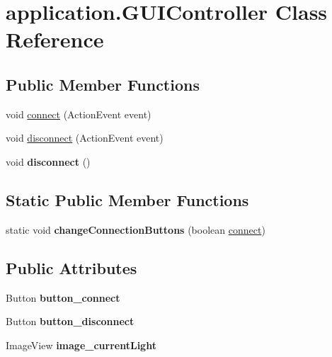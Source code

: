 \hypertarget{classapplication_1_1_g_u_i_controller}{}\section{application.\+G\+U\+I\+Controller Class Reference}
\label{classapplication_1_1_g_u_i_controller}
\subsection*{Public Member Functions}
\begin{DoxyCompactItemize}
\item 
void \hyperlink{classapplication_1_1_g_u_i_controller_ab633aa7b0d15917ec268a9a98affe53e}{connect} (Action\+Event event)
\item 
void \hyperlink{classapplication_1_1_g_u_i_controller_a560f50480318cf3c026e748e9d0e175d}{disconnect} (Action\+Event event)
\item 
void {\bfseries disconnect} ()\hypertarget{classapplication_1_1_g_u_i_controller_a1f23ccf4e55ce4a5a6ddcd86d090d3db}{}\label{classapplication_1_1_g_u_i_controller_a1f23ccf4e55ce4a5a6ddcd86d090d3db}

\end{DoxyCompactItemize}
\subsection*{Static Public Member Functions}
\begin{DoxyCompactItemize}
\item 
static void {\bfseries change\+Connection\+Buttons} (boolean \hyperlink{classapplication_1_1_g_u_i_controller_ab633aa7b0d15917ec268a9a98affe53e}{connect})\hypertarget{classapplication_1_1_g_u_i_controller_aa1c5b4085059ed56807425692e87e608}{}\label{classapplication_1_1_g_u_i_controller_aa1c5b4085059ed56807425692e87e608}

\end{DoxyCompactItemize}
\subsection*{Public Attributes}
\begin{DoxyCompactItemize}
\item 
Button {\bfseries button\+\_\+connect}\hypertarget{classapplication_1_1_g_u_i_controller_a6ade76f171c517d12818262a6acf22f9}{}\label{classapplication_1_1_g_u_i_controller_a6ade76f171c517d12818262a6acf22f9}

\item 
Button {\bfseries button\+\_\+disconnect}\hypertarget{classapplication_1_1_g_u_i_controller_adf0551f395ff11e60c5587ddd6c052ef}{}\label{classapplication_1_1_g_u_i_controller_adf0551f395ff11e60c5587ddd6c052ef}

\item 
Image\+View {\bfseries image\+\_\+current\+Light}\hypertarget{classapplication_1_1_g_u_i_controller_aecfe62ae1040631b8963cbc2633b4dd5}{}\label{classapplication_1_1_g_u_i_controller_aecfe62ae1040631b8963cbc2633b4dd5}

\end{DoxyCompactItemize}

